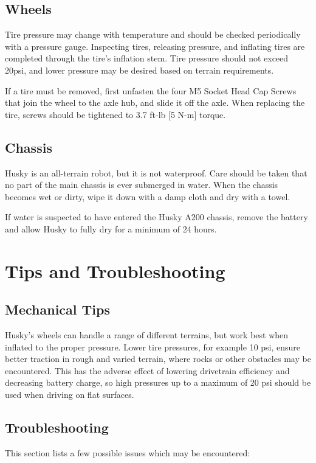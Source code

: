\documentclass[]{clearpath-latex/clearpath-manual}
\begin{document}
\subsection{Wheels}
Tire pressure may change with temperature and should be checked periodically with a pressure gauge.
Inspecting tires, releasing pressure, and inflating tires are completed through the tire’s inflation stem.
Tire pressure should not exceed 20psi, and lower pressure may be desired based on terrain requirements.

If a tire must be removed, first unfasten the four M5 Socket Head Cap Screws that join the wheel to the axle hub,
and slide it off the axle. When replacing the tire, screws should be tightened to 3.7 ft-lb [5 N-m] torque.

\subsection{Chassis}
Husky is an all-terrain robot, but it is not waterproof. Care should be taken that no part of the main
chassis is ever submerged in water. When the chassis becomes wet or dirty, wipe it down with a damp cloth
and dry with a towel.

If water is suspected to have entered the Husky A200 chassis, remove the battery and allow Husky to fully dry for a minimum of 24 hours.

\section{Tips and Troubleshooting}

\subsection{Mechanical Tips}
Husky’s wheels can handle a range of different terrains, but work best when inflated to the proper pressure.
Lower tire pressures, for example 10 psi, ensure better traction in rough and varied terrain, where rocks or
other obstacles may be encountered. This has the adverse effect of lowering drivetrain efficiency and decreasing
battery charge, so high pressures up to a maximum of 20 psi should be used when driving on flat surfaces.

\subsection{Troubleshooting}

This section lists a few possible issues which may be encountered:
\end{document}
